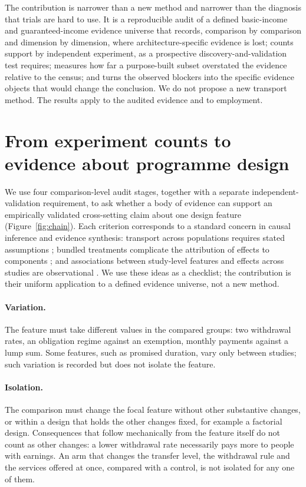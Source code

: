 \documentclass[11pt]{article}
\begin{document}
The contribution is narrower than a new method and narrower than the diagnosis that trials are hard to use. It is a reproducible audit of a defined basic-income and guaranteed-income evidence universe that records, comparison by comparison and dimension by dimension, where architecture-specific evidence is lost; counts support by independent experiment, as a prospective discovery-and-validation test requires; measures how far a purpose-built subset overstated the evidence relative to the census; and turns the observed blockers into the specific evidence objects that would change the conclusion. We do not propose a new transport method. The results apply to the audited evidence and to employment.

\section{From experiment counts to evidence about programme design}

We use four comparison-level audit stages, together with a separate independent-validation requirement, to ask whether a body of evidence can support an empirically validated cross-setting claim about one design feature (Figure~\ref{fig:chain}). Each criterion corresponds to a standard concern in causal inference and evidence synthesis: transport across populations requires stated assumptions \citep{pearl2014,degtiar2023}; bundled treatments complicate the attribution of effects to components \citep{hernan2011}; and associations between study-level features and effects across studies are observational \citep{thompson2002,riley2020}. We use these ideas as a checklist; the contribution is their uniform application to a defined evidence universe, not a new method.

\paragraph{Variation.} The feature must take different values in the compared groups: two withdrawal rates, an obligation regime against an exemption, monthly payments against a lump sum. Some features, such as promised duration, vary only between studies; such variation is recorded but does not isolate the feature.

\paragraph{Isolation.} The comparison must change the focal feature without other substantive changes, or within a design that holds the other changes fixed, for example a factorial design. Consequences that follow mechanically from the feature itself do not count as other changes: a lower withdrawal rate necessarily pays more to people with earnings. An arm that changes the transfer level, the withdrawal rule and the services offered at once, compared with a control, is not isolated for any one of them.
\end{document}
